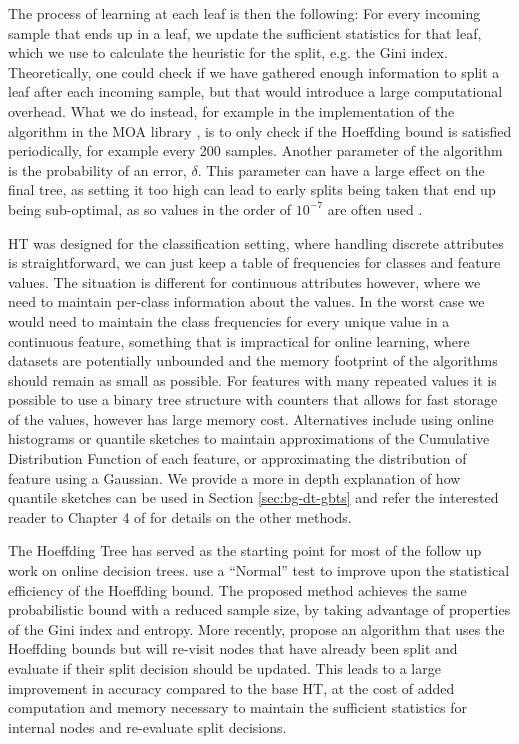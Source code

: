 The process of learning at each leaf is then the following: For every incoming sample
that ends up in a leaf, we update the sufficient statistics for that leaf, which we
use to calculate the heuristic for the split, e.g. the Gini index. Theoretically,
one could check if we have gathered enough information to split a leaf after each
incoming sample, but that would introduce a large computational overhead. What we
do instead, for example in the implementation of the algorithm in the MOA library \cite{bifet2010moa},
is to only check if the Hoeffding bound is satisfied periodically, for example
every 200 samples. Another parameter of the algorithm is the probability of an error,
$\delta$. This parameter can have a large effect on the final tree, as setting it
too high can lead to early splits being taken that end up being sub-optimal, as so
values in the order of $10^{-7}$ are often used \cite{data-stream-mining}.

HT was designed for the classification setting, where handling discrete attributes
is straightforward, we can just keep a table of frequencies for classes and feature
values. The situation
is different for continuous attributes however, where we need to maintain per-class
information about the values. In the worst case we would need to maintain the class
frequencies for every unique value in a continuous feature, something that is impractical
for online learning, where datasets are potentially unbounded and the memory footprint
of the algorithms should remain as small as possible. For features with many repeated
values it is possible to use a binary tree structure with counters that allows for
fast storage of the values, however has large memory cost. Alternatives include
using online histograms or quantile sketches \cite{greenwald2016quantiles}
to maintain approximations of the Cumulative Distribution Function of
each feature, or approximating the distribution of feature using a Gaussian.
We provide a more in depth explanation of how quantile sketches can be used
in Section \ref{sec:bg-dt-gbts} and refer the interested reader to Chapter 4 of \citet{data-stream-mining} for details on the other methods.

The Hoeffding Tree has served as the starting point for most of the follow up work on
online decision trees. \citet{vfdt-normal} use a ``Normal'' test to improve
upon the statistical efficiency of the Hoeffding bound. The proposed method achieves
the same probabilistic bound with a reduced sample size, by taking
advantage of properties of the Gini index and entropy. More recently,
\citet{efdt} propose an algorithm that uses the Hoeffding bounds but
will re-visit nodes that have already been split and evaluate if their
split decision should be updated. This leads to a large improvement in accuracy
compared to the base HT,
at the cost of added computation and memory necessary to maintain
the sufficient statistics for internal nodes and re-evaluate split
decisions.

